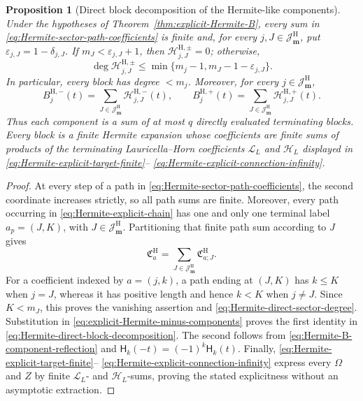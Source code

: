 \documentclass[10pt]{amsart}
\newcommand{\mm}{\boldsymbol m}
\theoremstyle{plain}
\newtheorem{proposition}[theorem]{Proposition}
\theoremstyle{definition}
\theoremstyle{remark}
\begin{document}
\begin{proposition}[Direct block decomposition of the Hermite-like components]
\label{prop:Hermite-direct-block-decomposition}
Under the hypotheses of
Theorem~\ref{thm:explicit-Hermite-B}, every sum in
\eqref{eq:Hermite-sector-path-coefficients} is finite and, for every
\(j,J\in\mathcal J_{\mm}^{\mathrm H}\), put
\(\varepsilon_{j,J}=1-\delta_{j,J}\). If
\(m_J<\varepsilon_{j,J}+1\), then
\(\mathscr H_{j,J}^{\mathrm H,\pm}=0\); otherwise,
\begin{equation}
 \deg\mathscr H_{j,J}^{\mathrm H,\pm}
 \le\min\{m_j-1,m_J-1-\varepsilon_{j,J}\}.
 \label{eq:Hermite-direct-sector-degree}
\end{equation}
In particular, every block has degree \(<m_j\). Moreover, for every
\(j\in\mathcal J_{\mm}^{\mathrm H}\),
\begin{equation}
 B_j^{\mathrm H,-}(t)
 =\sum_{J\in\mathcal J_{\mm}^{\mathrm H}}
   \mathscr H_{j,J}^{\mathrm H,-}(t),
 \qquad
 B_j^{\mathrm H,+}(t)
 =\sum_{J\in\mathcal J_{\mm}^{\mathrm H}}
   \mathscr H_{j,J}^{\mathrm H,+}(t).
 \label{eq:Hermite-direct-block-decomposition}
\end{equation}
Thus each component is a sum of at most \(q\) directly evaluated
terminating blocks. Every block is a finite Hermite expansion whose
coefficients are finite sums of products of the terminating
Lauricella--Horn coefficients \(\mathscr L_L\) and \(\mathscr H_L\)
displayed in
\eqref{eq:Hermite-explicit-target-finite}--
\eqref{eq:Hermite-explicit-connection-infinity}.
\end{proposition}

\begin{proof}
At every step of a path in
\eqref{eq:Hermite-sector-path-coefficients}, the second coordinate
increases strictly, so all path sums are finite. Moreover, every path
occurring in \eqref{eq:Hermite-explicit-chain} has one and only one
terminal label \(a_p=(J,K)\), with
\(J\in\mathcal J_{\mm}^{\mathrm H}\). Partitioning that finite path sum
according to \(J\) gives
\[
 \mathfrak C_a^{\mathrm H}
 =\sum_{J\in\mathcal J_{\mm}^{\mathrm H}}
 \mathfrak C_{a;J}^{\mathrm H}.
\]
For a coefficient indexed by \(a=(j,k)\), a path ending at
\((J,K)\) has \(k\le K\) when \(j=J\), whereas it has positive length
and hence \(k<K\) when \(j\ne J\). Since \(K<m_J\), this proves the
vanishing assertion and \eqref{eq:Hermite-direct-sector-degree}.
Substitution in \eqref{eq:explicit-Hermite-minus-components} proves the
first identity in \eqref{eq:Hermite-direct-block-decomposition}. The
second follows from \eqref{eq:Hermite-B-component-reflection} and
\(\mathsf H_k(-t)=(-1)^k\mathsf H_k(t)\). Finally,
\eqref{eq:Hermite-explicit-target-finite}--
\eqref{eq:Hermite-explicit-connection-infinity} express every
\(\Omega\) and \(Z\) by finite \(\mathscr L_L\)- and
\(\mathscr H_L\)-sums, proving the stated explicitness without an
asymptotic extraction.
\end{proof}
\end{document}
